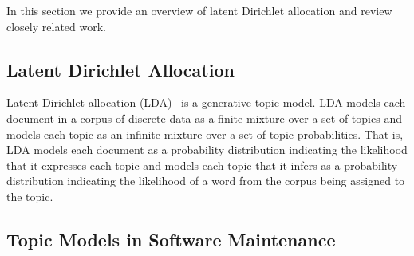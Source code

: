 
In this section we provide an overview of latent Dirichlet allocation and review closely related work.

\subsection{Latent Dirichlet Allocation}

Latent Dirichlet allocation (LDA)~\cite{Blei-etal:2003} is a generative topic model.
LDA models each document in a corpus of discrete data as a finite mixture over a set of topics
and models each topic as an infinite mixture over a set of topic probabilities.
That is, LDA models each document as a probability distribution
indicating the likelihood that it expresses each topic and
models each topic that it infers as a probability distribution
indicating the likelihood of a word from the corpus being assigned to the topic.



\subsection{Topic Models in Software Maintenance}


